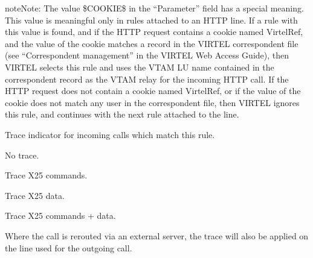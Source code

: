 \documentclass[letterpaper,10pt,english]{sphinxmanual}
\begin{document}
\begin{sphinxadmonition}{note}{Note:}
\sphinxAtStartPar
The value \$COOKIE\$ in the “Parameter” field has a special meaning. This value is meaningful only in rules attached to an HTTP line. If a rule with this value is found, and if the HTTP request contains a cookie named VirtelRef, and the value of the cookie matches a record in the VIRTEL correspondent file (see “Correspondent management” in the VIRTEL Web Access Guide), then VIRTEL selects this rule and uses the VTAM LU name contained in the correspondent record as the VTAM relay for the incoming HTTP call. If the HTTP request does not contain a cookie named VirtelRef, or if the value of the cookie does not match any user in the correspondent file, then VIRTEL ignores this rule, and continues with the next rule attached to the line.
\end{sphinxadmonition}
\begin{description}
\sphinxAtStartPar
Trace indicator for incoming calls which match this rule.
\begin{description}
\sphinxAtStartPar
No trace.

\sphinxAtStartPar
Trace X25 commands.

\sphinxAtStartPar
Trace X25 data.

\sphinxAtStartPar
Trace X25 commands + data.

\sphinxAtStartPar
Where the call is rerouted via an external server, the trace will also be applied on the line used for the outgoing call.

\end{description}

\end{description}
\end{document}
